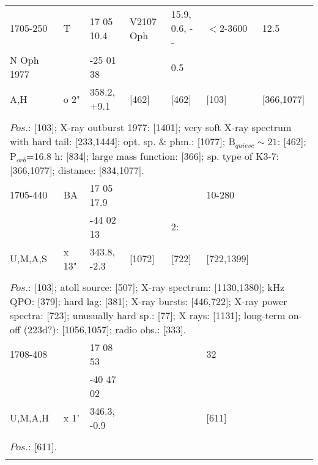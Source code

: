 \documentclass{aa}
\begin{document}
\begin{tabular}{p{2.5cm}p{1cm}p{1.8cm}p{2.3cm}p{3.3cm}p{2.0cm}p{2.2cm}}
\noalign{\smallskip}
1705-250        & T             & 17 05 10.4           & V2107 Oph     & 15.9, 0.6, - -          & $<$2-3600         & 12.5                   \\
N Oph 1977   &                 & -25 01 38            &                           &  0.5                         &                             &                            \\
    A,H              & o 2"        & 358.2, +9.1          & [462]                & [462]                      & [103]                   & [366,1077]         \\
\\
\multicolumn{7}{p{17.5cm}}{
$Pos$.: [103]; X-ray outburst 1977: [1401]; very soft X-ray spectrum with hard tail: [233,1444]; opt. sp. \& phm.: [1077]; 
B$_{quiesc} \sim 21$: [462]; P$_{orb}$=16.8 h: [834]; large mass function: [366]; sp. type of K3-7: [366,1077]; distance: 
[834,1077].}\\
\noalign{\smallskip}
\hline

\noalign{\smallskip}
1705-440        & BA            & 17 05 17.9          &                       &                         & 10-280            &       \\
                         &                   & -44 02 13            &                       & 2:                     &                         &      \\
U,M,A,S          & x 13"        & 343.8, -2.3          & [1072]           & [722]               & [722,1399]    &   \\
\\
\multicolumn{7}{p{17.5cm}}{
$Pos$.: [103]; atoll source: [507]; X-ray spectrum: [1130,1380]; kHz QPO: [379]; hard lag: [381]; X-ray bursts: [446,722]; 
X-ray power spectra: [723]; unusually hard sp.: [77]; X rays: [1131]; long-term on-off (223d?): [1056,1057]; radio obs.: 
[333].}\\
\noalign{\smallskip}
\hline

\noalign{\smallskip}
1708-408        &                   & 17 08 53            &                    &                         & 32        &       \\
                         &                   & -40 47 02           &                    &                         &              &      \\
U,M,A,H          & x 1'            & 346.3, -0.9        &                     &                        & [611]    &       \\
\\
\multicolumn{7}{p{17.5cm}}{
$Pos$.: [611].}\\
\noalign{\smallskip}
\hline


\end{tabular}
\end{document}
